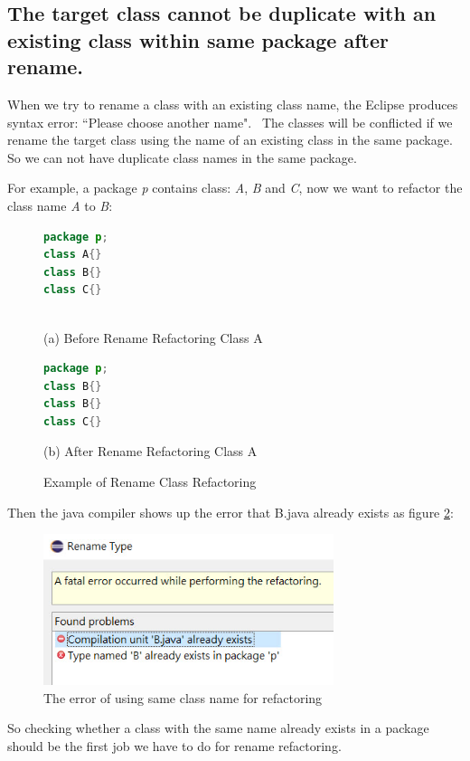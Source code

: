 \subsection{The target class cannot be duplicate with an existing class within same package after rename.}

When we try to rename a class with an existing class name, the Eclipse produces syntax error:
``Please choose another name".~\cite{EclipseWebPage} The classes will be conflicted if we rename the target class using the name of an existing class in the same package. So we can not have duplicate class names in the same package. 

For example, a package \textsl{p} contains class: \textsl{A}, \textsl{B} and \textsl{C}, now we want to refactor the class name \textsl{A} to \textsl{B}:

\begin{figure}[th]
\centering
\begin{minipage}[t]{0.6\linewidth}
\begin{lstlisting}[language=java, basicstyle=\scriptsize\ttfamily,frame=single]
package p;
class A{}	
class B{}
class C{}
 
\end{lstlisting}
\tiny{(a) Before Rename Refactoring Class A}
\end{minipage}
\hfill


\begin{minipage}[t]{0.6\linewidth}
\begin{lstlisting}[language=java, basicstyle=\scriptsize\ttfamily,frame=single]
package p;
class B{}	
class B{}
class C{}

\end{lstlisting}
\tiny{(b) After Rename Refactoring Class A}
\end{minipage}
\caption{Example of Rename Class Refactoring}
\label{fig:afterrr}
\end{figure}

Then the java compiler shows up the error that B.java already exists as figure \ref{fig:renameclassname}:

\begin{figure}[H]
\centerline{\includegraphics[width=85mm,scale=0.5]{SCN.jpg}}
\caption{The error of using same class name for refactoring}
\label{fig:renameclassname}
\end{figure}

So checking whether a class with the same name already exists in a package should be the first job we have to do for rename refactoring.   